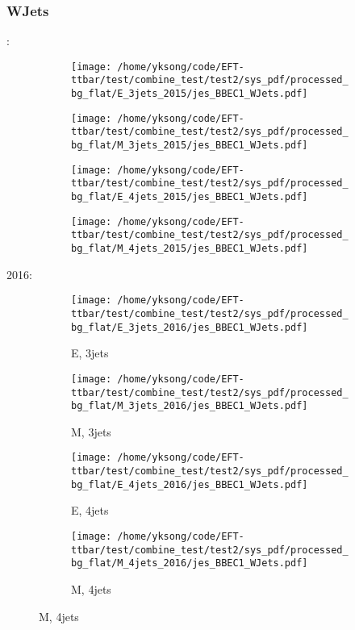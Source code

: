 \documentclass{beamer}
\begin{document}
\begin{frame}
\frametitle{WJets}
\fontsize{5}{1}:
\begin{figure}
\centering
\begin{subfigure}[b]{0.24\textwidth}
\texttt{[image: /home/yksong/code/EFT-ttbar/test/combine\_test/test2/sys\_pdf/processed\_bg\_flat/E\_3jets\_2015/jes\_BBEC1\_WJets.pdf]}
\end{subfigure}
\begin{subfigure}[b]{0.24\textwidth}
\texttt{[image: /home/yksong/code/EFT-ttbar/test/combine\_test/test2/sys\_pdf/processed\_bg\_flat/M\_3jets\_2015/jes\_BBEC1\_WJets.pdf]}
\end{subfigure}
\begin{subfigure}[b]{0.24\textwidth}
\texttt{[image: /home/yksong/code/EFT-ttbar/test/combine\_test/test2/sys\_pdf/processed\_bg\_flat/E\_4jets\_2015/jes\_BBEC1\_WJets.pdf]}
\end{subfigure}
\begin{subfigure}[b]{0.24\textwidth}
\texttt{[image: /home/yksong/code/EFT-ttbar/test/combine\_test/test2/sys\_pdf/processed\_bg\_flat/M\_4jets\_2015/jes\_BBEC1\_WJets.pdf]}
\end{subfigure}
\end{figure}
2016:
\begin{figure}
\centering
\begin{subfigure}[b]{0.24\textwidth}
\texttt{[image: /home/yksong/code/EFT-ttbar/test/combine\_test/test2/sys\_pdf/processed\_bg\_flat/E\_3jets\_2016/jes\_BBEC1\_WJets.pdf]}
\captionsetup{font=tiny}
\caption{E, 3jets}
\end{subfigure}
\begin{subfigure}[b]{0.24\textwidth}
\texttt{[image: /home/yksong/code/EFT-ttbar/test/combine\_test/test2/sys\_pdf/processed\_bg\_flat/M\_3jets\_2016/jes\_BBEC1\_WJets.pdf]}
\captionsetup{font=tiny}
\caption{M, 3jets}
\end{subfigure}
\begin{subfigure}[b]{0.24\textwidth}
\texttt{[image: /home/yksong/code/EFT-ttbar/test/combine\_test/test2/sys\_pdf/processed\_bg\_flat/E\_4jets\_2016/jes\_BBEC1\_WJets.pdf]}
\captionsetup{font=tiny}
\caption{E, 4jets}
\end{subfigure}
\begin{subfigure}[b]{0.24\textwidth}
\texttt{[image: /home/yksong/code/EFT-ttbar/test/combine\_test/test2/sys\_pdf/processed\_bg\_flat/M\_4jets\_2016/jes\_BBEC1\_WJets.pdf]}
\captionsetup{font=tiny}
\caption{M, 4jets}
\end{subfigure}
\end{figure}
\end{frame}
\end{document}
